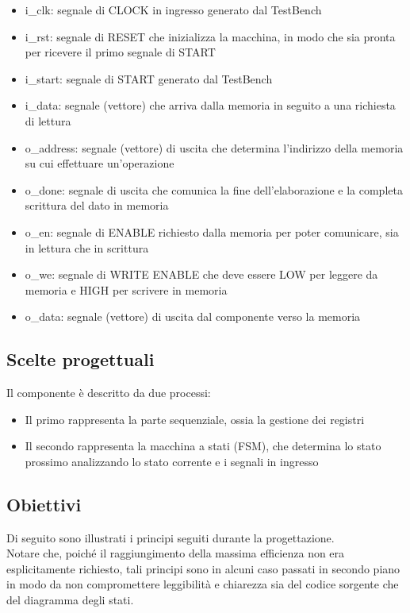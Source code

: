\documentclass[a4paper, 12pt]{article}
\begin{document}
\begin{itemize}
    \item i\_clk: segnale di CLOCK in ingresso generato dal TestBench
    \item i\_rst: segnale di RESET che inizializza la macchina, in modo che sia pronta per ricevere il primo segnale di START
    \item i\_start: segnale di START generato dal TestBench
    \item i\_data: segnale (vettore) che arriva dalla memoria in seguito a una richiesta di lettura
    \item o\_address: segnale (vettore) di uscita che determina l’indirizzo della memoria su cui effettuare un'operazione
    \item o\_done: segnale di uscita che comunica la fine dell’elaborazione e la completa scrittura del dato in memoria
    \item o\_en: segnale di ENABLE richiesto dalla memoria per poter comunicare, sia in lettura che in scrittura
    \item o\_we: segnale di WRITE ENABLE che deve essere LOW per leggere da memoria e HIGH per scrivere in memoria
    \item o\_data: segnale (vettore) di uscita dal componente verso la memoria
\end{itemize}

\subsection{Scelte progettuali}
Il componente è descritto da due processi:
\begin{itemize}
    \item Il primo rappresenta la parte sequenziale, ossia la gestione dei registri
    \item Il secondo rappresenta la macchina a stati (FSM), che determina lo stato prossimo analizzando lo stato corrente e i segnali in ingresso
\end{itemize}

\subsection{Obiettivi}
Di seguito sono illustrati i principi seguiti durante la progettazione. \\
Notare che, poiché il raggiungimento della massima efficienza non era esplicitamente richiesto, tali principi sono in alcuni caso passati in secondo piano in modo da non compromettere leggibilità e chiarezza sia del codice sorgente che del diagramma degli stati.
\end{document}
